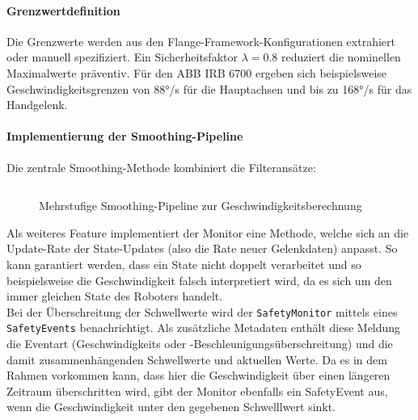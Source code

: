 \paragraph{Grenzwertdefinition} Die Grenzwerte werden aus den
Flange-Framework-Konfigurationen extrahiert oder manuell spezifiziert. Ein
Sicherheitsfaktor $\lambda = 0.8$ reduziert die nominellen Maximalwerte
präventiv. Für den ABB IRB 6700 ergeben sich beispielsweise
Geschwindigkeitsgrenzen von 88°/s für die Hauptachsen und bis zu 168°/s für das
Handgelenk.

\paragraph{Implementierung der Smoothing-Pipeline}
Die zentrale Smoothing-Methode kombiniert die Filteransätze:

\begin{figure}[H]
	\inputminted[fontsize=\footnotesize]{csharp}{code-snippets/SmoothVelocities.cs}
	\caption{Mehrstufige Smoothing-Pipeline zur Geschwindigkeitsberechnung}
	\label{listing:smoothing_pipeline}
\end{figure}

\noindent
Als weiteres Feature implementiert der Monitor eine Methode, welche sich an die
Update-Rate der State-Updates (also die Rate neuer Gelenkdaten) anpasst. So kann
garantiert werden, dass ein State nicht doppelt verarbeitet und so
beispielsweise die Geschwindigkeit falsch interpretiert wird, da es sich um den
immer gleichen State des Roboters handelt.\\

\noindent
Bei der Überschreitung der Schwellwerte wird der \texttt{SafetyMonitor}
mittels eines \texttt{SafetyEvents} benachrichtigt. Als zusätzliche Metadaten enthält
diese Meldung die Eventart (Geschwindigkeits oder
-Beschleunigungsüberschreitung) und die damit zusammenhängenden Schwellwerte und
aktuellen Werte. Da es in dem Rahmen vorkommen kann, dass hier die
Geschwindigkeit über einen längeren Zeitraum überschritten wird, gibt der
Monitor ebenfalls ein SafetyEvent aus, wenn die Geschwindigkeit unter den
gegebenen Schwelllwert sinkt.
